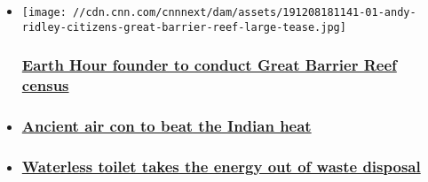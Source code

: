 \begin{itemize}
\item
  \href{/2019/12/15/australia/great-reef-census-andy-ridley/index.html}{}

  \texttt{[image: //cdn.cnn.com/cnnnext/dam/assets/191208181141-01-andy-ridley-citizens-great-barrier-reef-large-tease.jpg]}

  \hypertarget{earth-hour-founder-to-conduct-great-barrier-reef-census}{%
  \subsubsection{\texorpdfstring{\href{/2019/12/15/australia/great-reef-census-andy-ridley/index.html}{Earth
  Hour founder to conduct Great Barrier Reef
  census}}{Earth Hour founder to conduct Great Barrier Reef census}}\label{earth-hour-founder-to-conduct-great-barrier-reef-census}}
\item
  \hypertarget{ancient-air-con-to-beat-the-indian-heat}{%
  \subsubsection{\texorpdfstring{\href{/style/article/india-air-conditioning-ant-studio/index.html}{Ancient
  air con to beat the Indian
  heat}}{Ancient air con to beat the Indian heat}}\label{ancient-air-con-to-beat-the-indian-heat}}
\item
  \hypertarget{waterless-toilet-takes-the-energy-out-of-waste-disposal}{%
  \subsubsection{\texorpdfstring{\href{/2019/12/04/health/ecoloo-waterless-toilet/index.html}{Waterless
  toilet takes the energy out of waste
  disposal}}{Waterless toilet takes the energy out of waste disposal}}\label{waterless-toilet-takes-the-energy-out-of-waste-disposal}}
\end{itemize}

